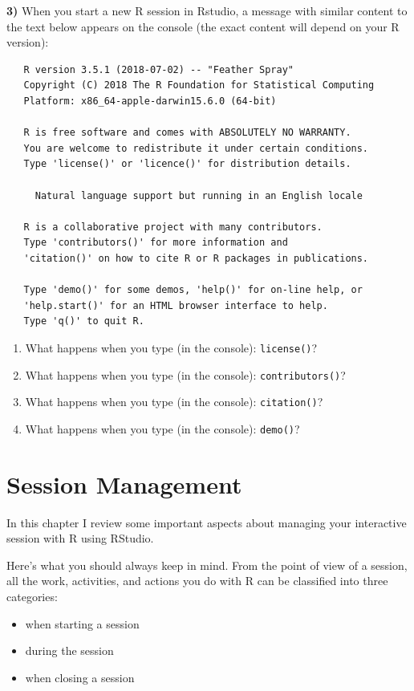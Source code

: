 \documentclass[
]{book}
\begin{document}
\textbf{3)} When you start a new R session in Rstudio, a message with similar content to
the text below appears on the console (the exact content will depend on your
R version):

\begin{verbatim}
   R version 3.5.1 (2018-07-02) -- "Feather Spray"
   Copyright (C) 2018 The R Foundation for Statistical Computing
   Platform: x86_64-apple-darwin15.6.0 (64-bit)

   R is free software and comes with ABSOLUTELY NO WARRANTY.
   You are welcome to redistribute it under certain conditions.
   Type 'license()' or 'licence()' for distribution details.

     Natural language support but running in an English locale   

   R is a collaborative project with many contributors.
   Type 'contributors()' for more information and
   'citation()' on how to cite R or R packages in publications.

   Type 'demo()' for some demos, 'help()' for on-line help, or
   'help.start()' for an HTML browser interface to help.
   Type 'q()' to quit R.
\end{verbatim}

\begin{enumerate}
\def\labelenumi{\alph{enumi})}
\item
  What happens when you type (in the console): \texttt{license()}?
\item
  What happens when you type (in the console): \texttt{contributors()}?
\item
  What happens when you type (in the console): \texttt{citation()}?
\item
  What happens when you type (in the console): \texttt{demo()}?
\end{enumerate}

\hypertarget{session}{%
\chapter{Session Management}\label{session}}

In this chapter I review some important aspects about managing your
interactive session with R using RStudio.

Here's what you should always keep in mind. From the point of view of a session,
all the work, activities, and actions you do with R can be classified into
three categories:

\begin{itemize}
\item
  when starting a session
\item
  during the session
\item
  when closing a session
\end{itemize}
\end{document}
